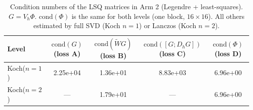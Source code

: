 \begin{table}[ht]
\centering
\caption{Condition numbers of the LSQ matrices in Arm 2 (Legendre + least-squares). $G = V_h \Phi$. $\mathrm{cond}(\Phi)$ is the same for both levels (one block, $16\times16$). All others estimated by full SVD (Koch $n=1$) or Lanczos (Koch $n=2$).}
\label{tab:e2-lsq-cond}
\begin{tabular}{@{}lcccc@{}}
\toprule
Level & $\mathrm{cond}(G)$ (loss A) & $\mathrm{cond}(\widetilde{W}G)$ (loss B) & $\mathrm{cond}([G;D_hG])$ (loss C) & $\mathrm{cond}(\Phi)$ (loss D) \\
\midrule
  Koch($n=1$) & 2.25e+04 & 1.36e+01 & 8.83e+03 & 6.96e+00 \\
  Koch($n=2$) & — & 1.79e+01 & — & 6.96e+00 \\
\bottomrule
\end{tabular}
\end{table}
